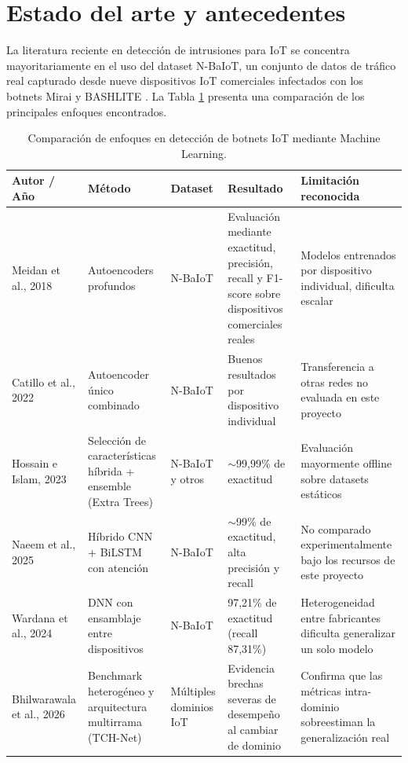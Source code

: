 \documentclass[11pt,a4paper]{article}
\begin{document}
\section{Estado del arte y antecedentes}
La literatura reciente en detección de intrusiones para IoT se concentra mayoritariamente en el uso del dataset N-BaIoT, un conjunto de datos de tráfico real capturado desde nueve dispositivos IoT comerciales infectados con los botnets Mirai y BASHLITE \cite{meidan2018}. La Tabla \ref{tab:estado-arte} presenta una comparación de los principales enfoques encontrados.

\begin{table}[H]
\centering
\caption{Comparación de enfoques en detección de botnets IoT mediante Machine Learning.}
\label{tab:estado-arte}
\small
\begin{tabularx}{\textwidth}{p{2.1cm}p{2.4cm}p{1.6cm}X X}
\toprule
\textbf{Autor / Año} & \textbf{Método} & \textbf{Dataset} & \textbf{Resultado} & \textbf{Limitación reconocida} \\
\midrule
Meidan et al., 2018 \cite{meidan2018} & Autoencoders profundos & N-BaIoT & Evaluación mediante exactitud, precisión, recall y F1-score sobre dispositivos comerciales reales & Modelos entrenados por dispositivo individual, dificulta escalar \\
Catillo et al., 2022 \cite{allinone2022} & Autoencoder único combinado & N-BaIoT & Buenos resultados por dispositivo individual & Transferencia a otras redes no evaluada en este proyecto \\
Hossain e Islam, 2023 \cite{hossain2023} & Selección de características híbrida + ensemble (Extra Trees) & N-BaIoT y otros & $\sim$99,99\% de exactitud & Evaluación mayormente offline sobre datasets estáticos \\
Naeem et al., 2025 \cite{cnnbilstm2025} & Híbrido CNN + BiLSTM con atención & N-BaIoT & $\sim$99\% de exactitud, alta precisión y recall & No comparado experimentalmente bajo los recursos de este proyecto \\
Wardana et al., 2024 \cite{ensembledn} & DNN con ensamblaje entre dispositivos & N-BaIoT & 97,21\% de exactitud (recall 87,31\%) & Heterogeneidad entre fabricantes dificulta generalizar un solo modelo \\
Bhilwarawala et al., 2026 \cite{bridge2026} & Benchmark heterogéneo y arquitectura multirrama (TCH-Net) & Múltiples dominios IoT & Evidencia brechas severas de desempeño al cambiar de dominio & Confirma que las métricas intra-dominio sobreestiman la generalización real \\
\bottomrule
\end{tabularx}
\end{table}
\end{document}
